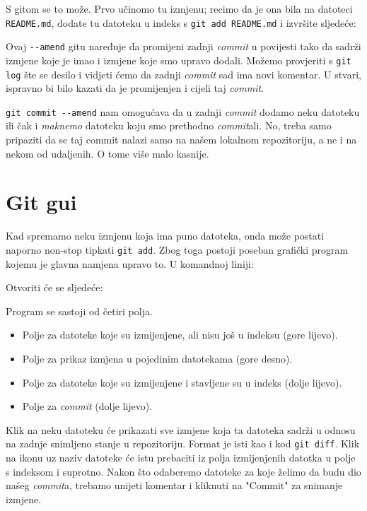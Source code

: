S gitom se to može.
Prvo učinomo tu izmjenu; recimo da je ona bila na datoteci \verb+README.md+, dodate tu datoteku u indeks s \verb+git add README.md+ i izvršite sljedeće:


Ovaj \verb+--amend+ gitu naređuje da promijeni zadnji \emph{commit} u povijesti tako da sadrži izmjene koje je imao i izmjene koje smo upravo dodali.
Možemo provjeriti s \verb+git log+ šte se desilo i vidjeti ćemo da zadnji \emph{commit} sad ima novi komentar.
U stvari, ispravno bi bilo kazati da je promijenjen i cijeli taj \emph{commit}.

\verb+git commit --amend+ nam omogućava da u zadnji \emph{commit} dodamo neku datoteku ili čak i \emph{maknemo} datoteku koju smo prethodno \emph{commit}ali. 
No, treba samo pripaziti da se taj commit nalazi samo na našem lokalnom repozitoriju, a ne i na nekom od udaljenih. 
O tome više malo kasnije.

\section*{Git gui}

Kad spremamo neku izmjenu koja ima puno datoteka, onda može postati naporno non-stop tipkati \verb+git add+.
Zbog toga postoji poseban grafički program kojemu je glavna namjena upravo to.
U komandnoj liniji:


Otvoriti će se sljedeće:


Program se sastoji od četiri polja. 

\begin{itemize}
	\item Polje za datoteke koje su izmijenjene, ali nisu još u indeksu (gore lijevo).
	\item Polje za prikaz izmjena u pojedinim datotekama (gore desno). 
	\item Polje za datoteke koje su izmijenjene i stavljene su u indeks (dolje lijevo).
	\item Polje za \emph{commit} (dolje lijevo).
\end{itemize}

Klik na neku datoteku će prikazati sve izmjene koja ta datoteka sadrži u odnosu na zadnje snimljeno stanje u repozitoriju.
Format je isti kao i kod \verb+git diff+.
Klik na ikonu uz naziv datoteke će istu prebaciti iz polja izmijenjenih datotka u polje s indeksom i suprotno.
Nakon što odaberemo datoteke za koje želimo da budu dio našeg \emph{commit}a, trebamo unijeti komentar i kliknuti na "Commit" za snimanje izmjene.

